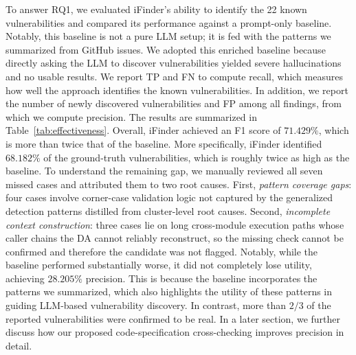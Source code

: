 To answer RQ1, we evaluated iFinder's ability to identify the 22 known vulnerabilities and compared its performance against a prompt-only baseline.
Notably, this baseline is not a pure LLM setup; it is fed with the patterns we summarized from GitHub issues. We adopted this enriched baseline because directly asking the LLM to discover vulnerabilities yielded severe hallucinations and no usable results.
We report TP and FN to compute recall, which measures how well the approach identifies the known vulnerabilities. In addition, we report the number of newly discovered vulnerabilities and FP among all findings, from which we compute precision.
The results are summarized in Table~\ref{tab:effectiveness}. 
Overall, iFinder achieved an F1 score of $71.429\%$, which is more than twice that of the baseline.
More specifically, iFinder identified $68.182\%$ of the ground-truth vulnerabilities, which is roughly twice as high as the baseline.
To understand the remaining gap, we manually reviewed all seven missed cases and attributed them to two root causes.
First, \textit{pattern coverage gaps}: four cases involve corner-case validation logic not captured by the generalized detection patterns distilled from cluster-level root causes. 
Second, \textit{incomplete context construction}: three cases lie on long cross-module execution paths whose caller chains the DA cannot reliably reconstruct, so the missing check cannot be confirmed and therefore the candidate was not flagged.
Notably, while the baseline performed substantially worse, it did not completely lose utility, achieving $28.205\%$ precision. 
This is because the baseline incorporates the patterns we summarized, which also highlights the utility of these patterns in guiding LLM-based vulnerability discovery.
In contrast, more than $2/3$ of the reported vulnerabilities were confirmed to be real.
In a later section, we further discuss how our proposed code-specification cross-checking improves precision in detail.


\begin{table}[!t]
  \centering
  \caption{Detection performance on the 22 ground-truth vulnerabilities.}
  \label{tab:effectiveness}
\end{table}







